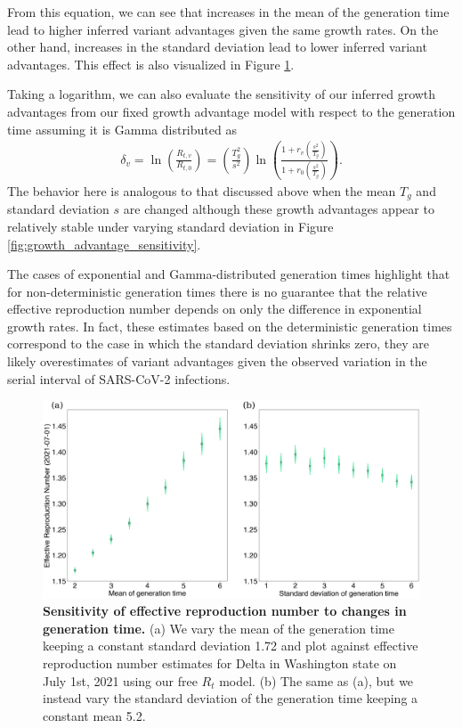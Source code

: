 \documentclass[11pt,oneside,letterpaper]{article}
\begin{document}
From this equation, we can see that increases in the mean of the generation time lead to higher inferred variant advantages given the same growth rates. On the other hand, increases in the standard deviation lead to lower inferred variant advantages. This effect is also visualized in Figure \ref{fig:generation_time_sensitivity}.

Taking a logarithm, we can also evaluate the sensitivity of our inferred growth advantages from our fixed growth advantage model with respect to the generation time assuming it is Gamma distributed as
\begin{align*}
 \delta_{v}  = \ln \left( \frac{R_{t,v}}{R_{t,0}} \right) = \left( \frac{T_{g}^{2}}{s^{2}} \right)  \ln \left( \frac{1 + r_{v}  \left(\frac{s^{2}}{T_{g}}\right)}{1 + r_{0} \left(\frac{s^{2}}{T_{g}}\right) } \right).
\end{align*}
The behavior here is analogous to that discussed above when the mean $T_{g}$ and standard deviation $s$ are changed although these growth advantages appear to relatively stable under varying standard deviation in Figure \ref{fig:growth_advantage_sensitivity}.

The cases of exponential and Gamma-distributed generation times highlight that for non-deterministic generation times there is no guarantee that the relative effective reproduction number depends on only the difference in exponential growth rates.
In fact, these estimates based on the deterministic generation times correspond to the case in which the standard deviation shrinks zero, they are likely overestimates of variant advantages given the observed variation in the serial interval of SARS-CoV-2 infections.

\begin{figure}
  \centering
  \includegraphics[width=\linewidth]{figs/generation_time_sensitivity.png}
  \caption{\textbf{Sensitivity of effective reproduction number to changes in generation time.} (a) We vary the mean of the generation time keeping a constant standard deviation 1.72 and plot against effective reproduction number estimates for Delta in Washington state on July 1st, 2021 using our free $R_{t}$ model.  (b) The same as (a), but we instead vary the standard deviation of the generation time keeping a constant mean 5.2.}%
  \label{fig:generation_time_sensitivity}
\end{figure}
\end{document}
